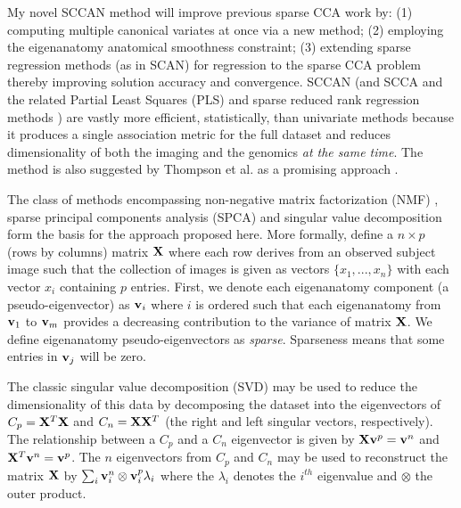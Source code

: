 \documentclass{llncs}
\newcommand{\X}{{\bf X}}
\newcommand{\vv}{{\bf v}}
\begin{document}
My novel SCCAN method will improve previous sparse CCA work by: (1) computing multiple canonical variates at once via a new method; (2) employing the eigenanatomy anatomical smoothness constraint; (3) extending sparse regression methods (as in SCAN) for regression to the sparse CCA problem thereby improving solution accuracy and convergence. %
SCCAN (and SCCA \cite{witten_extensions_2009} and the related Partial Least Squares (PLS) \cite{LeFloch2012} and sparse reduced rank regression methods \cite{Vounou2010}) are vastly more efficient, statistically, than univariate methods because it produces a single association metric for the full dataset and reduces dimensionality of both the imaging and the genomics {\em at the same time}.  %
The method is also suggested by Thompson et al. as a promising approach \cite{Glahn2007,Thompson2010}. 




The class of methods encompassing non-negative matrix factorization
(NMF) \cite{Lee1999,sparseNMF_hoyer,sparseNMF_kim,sparseNMF_heiler},
sparse principal components analysis (SPCA)
\cite{sparsePCA_zou,sparsePCA_jordan,sparsePCA_journee,sparsePCA_witten,Gandy2010,Lee2011}
and singular value decomposition \cite{Sill2011,Lee2010b,Yeung2002}
form the basis for the approach proposed here. More formally, define a
$n \times p$ (rows by columns) matrix $\X$ where each row derives from
an observed subject image such that the collection of images is given
as vectors $\{x_1,...,x_n\}$ with each vector $x_i$ containing $p$ entries.  
First, we denote each eigenanatomy component (a pseudo-eigenvector) as
${\vv}_i$ where $i$ is ordered such that each eigenanatomy from
${\vv}_1$ to ${\vv}_m$ provides a decreasing contribution to the
variance of matrix $\X$.  We define eigenanatomy pseudo-eigenvectors as {\em
  sparse}.  Sparseness means that some entries in ${\vv}_j$ will be zero.
 
The classic singular value decomposition (SVD) may be used to reduce the dimensionality of this data by decomposing the dataset into the eigenvectors of $C_p = \X^T\X$ and $C_n = \X\X^T$ (the right and left singular vectors, respectively).  
The relationship between a $C_p$ and a $C_n$ eigenvector is given by $\X \vv^p = \vv^n$ and $\X^T \vv^n = \vv^p$.  
The $n$ eigenvectors from $C_p$ and $C_n$ may be used to reconstruct the matrix $\X$ by 
$\sum_i \vv^n_i \otimes \vv^p_i \lambda_i $
where the $\lambda_i$ denotes the $i^{th}$ eigenvalue and $\otimes$ the outer product.
\end{document}
